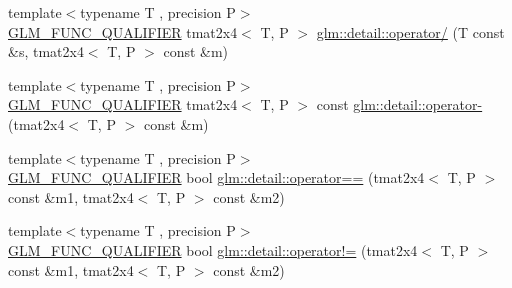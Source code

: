 \begin{DoxyCompactItemize}
\item 
{\footnotesize template$<$typename T , precision P$>$ }\\\hyperlink{setup_8hpp_a33fdea6f91c5f834105f7415e2a64407}{G\+L\+M\+\_\+\+F\+U\+N\+C\+\_\+\+Q\+U\+A\+L\+I\+F\+I\+ER} tmat2x4$<$ T, P $>$ \hyperlink{namespaceglm_1_1detail_a52bc5248c292a815502d132ca3132786}{glm\+::detail\+::operator/} (T const \&s, tmat2x4$<$ T, P $>$ const \&m)
\item 
{\footnotesize template$<$typename T , precision P$>$ }\\\hyperlink{setup_8hpp_a33fdea6f91c5f834105f7415e2a64407}{G\+L\+M\+\_\+\+F\+U\+N\+C\+\_\+\+Q\+U\+A\+L\+I\+F\+I\+ER} tmat2x4$<$ T, P $>$ const \hyperlink{namespaceglm_1_1detail_ad2e82d48aea958ecd757d35d32470aed}{glm\+::detail\+::operator-\/} (tmat2x4$<$ T, P $>$ const \&m)
\item 
{\footnotesize template$<$typename T , precision P$>$ }\\\hyperlink{setup_8hpp_a33fdea6f91c5f834105f7415e2a64407}{G\+L\+M\+\_\+\+F\+U\+N\+C\+\_\+\+Q\+U\+A\+L\+I\+F\+I\+ER} bool \hyperlink{namespaceglm_1_1detail_a5841585c5160598e3aa6827b4ce91585}{glm\+::detail\+::operator==} (tmat2x4$<$ T, P $>$ const \&m1, tmat2x4$<$ T, P $>$ const \&m2)
\item 
{\footnotesize template$<$typename T , precision P$>$ }\\\hyperlink{setup_8hpp_a33fdea6f91c5f834105f7415e2a64407}{G\+L\+M\+\_\+\+F\+U\+N\+C\+\_\+\+Q\+U\+A\+L\+I\+F\+I\+ER} bool \hyperlink{namespaceglm_1_1detail_a69d9152587fa4c96d8b365c8b5b7ddbf}{glm\+::detail\+::operator!=} (tmat2x4$<$ T, P $>$ const \&m1, tmat2x4$<$ T, P $>$ const \&m2)
\end{DoxyCompactItemize}
